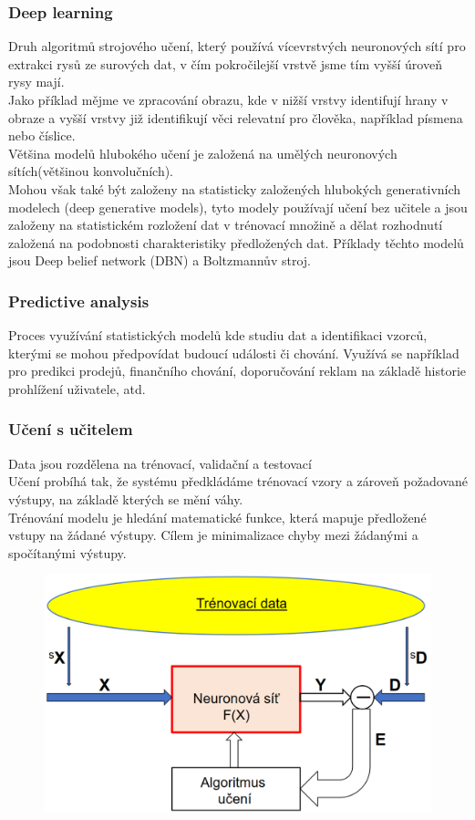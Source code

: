 \subsubsection{Deep learning}
Druh algoritmů strojového učení, který používá vícevrstvých neuronových sítí pro extrakci rysů ze surových dat, v čím pokročilejší vrstvě jsme tím vyšší úroveň rysy mají.\\
Jako příklad mějme ve zpracování obrazu, kde v nižší vrstvy identifují hrany v obraze a vyšší vrstvy již identifikují věci relevatní pro člověka, například písmena nebo číslice.\\
Většina modelů hlubokého učení je založená na umělých neuronových sítích(většinou konvolučních).\\
Mohou však také být založeny na statisticky založených hlubokých generativních modelech (deep generative models), tyto modely používají učení bez učitele a jsou založeny na statistickém rozložení dat v trénovací množině a dělat rozhodnutí založená na podobnosti charakteristiky předložených dat. Příklady těchto modelů jsou Deep belief network (DBN) a Boltzmannův stroj.\\
\subsubsection{Predictive analysis}
Proces využívání statistických modelů kde studiu dat a identifikaci vzorců, kterými se mohou předpovídat budoucí události či chování. Využívá se například pro predikci prodejů, finančního chování, doporučování reklam na základě historie prohlížení uživatele, atd.\\
\subsubsection{Učení s učitelem}
\label{typ_uceni}
Data jsou rozdělena na trénovací, validační a testovací\\
Učení probíhá tak, že systému předkládáme trénovací vzory a zároveň požadované výstupy, na základě kterých se mění váhy.\\
Trénování modelu je hledání matematické funkce, která mapuje předložené vstupy na žádané výstupy. Cílem je minimalizace chyby mezi žádanými a spočítanými výstupy.\\
\newpage
\begin{figure}[h!]
    \includegraphics[scale = 0.3]{images/sUcitelem.png}
\end{figure}

